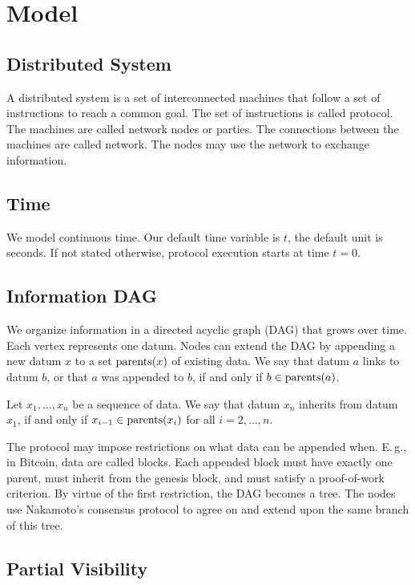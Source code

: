 \section{Model}

\subsection{Distributed System} \label{sec:distsys}

A distributed system is a set of interconnected machines that follow a set of instructions to reach a common goal.
The set of instructions is called protocol.
The machines are called network nodes or parties.
The connections between the machines are called network.
The nodes may use the network to exchange information.

\subsection{Time} \label{sec:time}

We model continuous time.
Our default time variable is $t$, the default unit is seconds.
If not stated otherwise, protocol execution starts at time $t = 0$.

\subsection{Information DAG} \label{sec:infodag}

We organize information in a directed acyclic graph (DAG) that grows over time.
Each vertex represents one datum.
Nodes can extend the DAG by appending a new datum $x$ to a set $\operatorname{parents}(x)$ of existing data.
We say that datum $a$ links to datum $b$, or that $a$ was appended to $b$, if and only if $b \in \operatorname{parents}(a)$.

Let $x_1, \dots, x_n$ be a sequence of data.
We say that datum $x_n$ inherits from datum $x_1$, if and only if
$x_{i-1} \in \operatorname{parents}(x_{i})$ for all $i = 2, \dots, n$.

The protocol may impose restrictions on what data can be appended when.
E.\,g., in Bitcoin, data are called blocks.
Each appended block must have exactly one parent, must inherit from the genesis block, and must satisfy a proof-of-work criterion.
By virtue of the first restriction, the DAG becomes a tree.
The nodes use Nakamoto's consensus protocol to agree on and extend upon the same branch of this tree.

\subsection{Partial Visibility} \label{sec:visibility}

